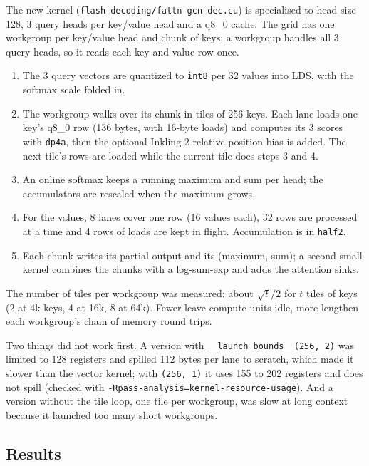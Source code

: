 \documentclass[11pt,a4paper]{article}
\newcommand{\code}[1]{\texttt{#1}}
\begin{document}
The new kernel (\code{flash-decoding/fattn-gcn-dec.cu}) is specialised to head size 128, 3 query heads per key/value
head and a q8\_0 cache. The grid has one workgroup per key/value head and chunk of keys; a workgroup handles all 3 query
heads, so it reads each key and value row once.
\begin{enumerate}
\item The 3 query vectors are quantized to \code{int8} per 32 values into LDS, with the softmax scale folded in.
\item The workgroup walks over its chunk in tiles of 256 keys. Each lane loads one key's q8\_0 row (136 bytes, with
16-byte loads) and computes its 3 scores with \code{dp4a}, then the optional Inkling 2 relative-position bias is added.
The next tile's rows are loaded while the current tile does steps 3 and 4.
\item An online softmax keeps a running maximum and sum per head; the accumulators are rescaled when the maximum grows.
\item For the values, 8 lanes cover one row (16 values each), 32 rows are processed at a time and 4 rows of loads are
kept in flight. Accumulation is in \code{half2}.
\item Each chunk writes its partial output and its (maximum, sum); a second small kernel combines the chunks with a
log-sum-exp and adds the attention sinks.
\end{enumerate}
The number of tiles per workgroup was measured: about $\sqrt{t}/2$ for $t$ tiles of keys (2 at 4k keys, 4 at 16k,
8 at 64k). Fewer leave compute units idle, more lengthen each workgroup's chain of memory round trips.

Two things did not work first. A version with \code{\_\_launch\_bounds\_\_(256, 2)} was limited to 128 registers and
spilled 112 bytes per lane to scratch, which made it slower than the vector kernel; with \code{(256, 1)} it uses 155 to
202 registers and does not spill (checked with \code{-Rpass-analysis=kernel-resource-usage}). And a version without the
tile loop, one tile per workgroup, was slow at long context because it launched too many short workgroups.

\subsection{Results}
\end{document}
